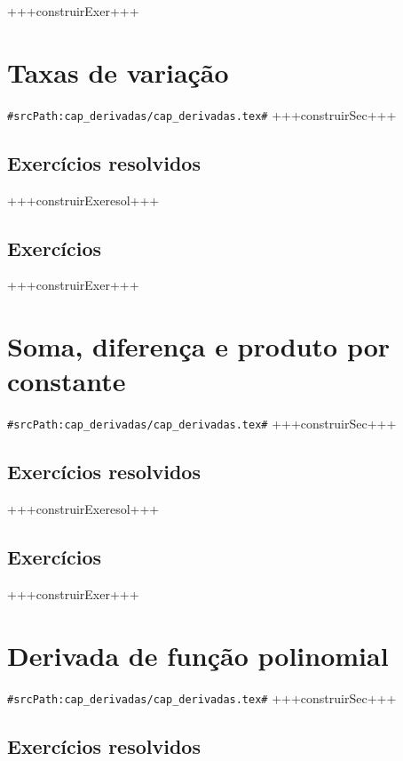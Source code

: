 +++construirExer+++


\section{Taxas de variação}
\verb+#srcPath:cap_derivadas/cap_derivadas.tex#+
+++construirSec+++

\subsection*{Exercícios resolvidos}

+++construirExeresol+++


\subsection*{Exercícios}

+++construirExer+++


\section{Soma, diferença e produto por constante}
\verb+#srcPath:cap_derivadas/cap_derivadas.tex#+
+++construirSec+++

\subsection*{Exercícios resolvidos}

+++construirExeresol+++


\subsection*{Exercícios}

+++construirExer+++


\section{Derivada de função polinomial}
\verb+#srcPath:cap_derivadas/cap_derivadas.tex#+
+++construirSec+++

\subsection*{Exercícios resolvidos}

